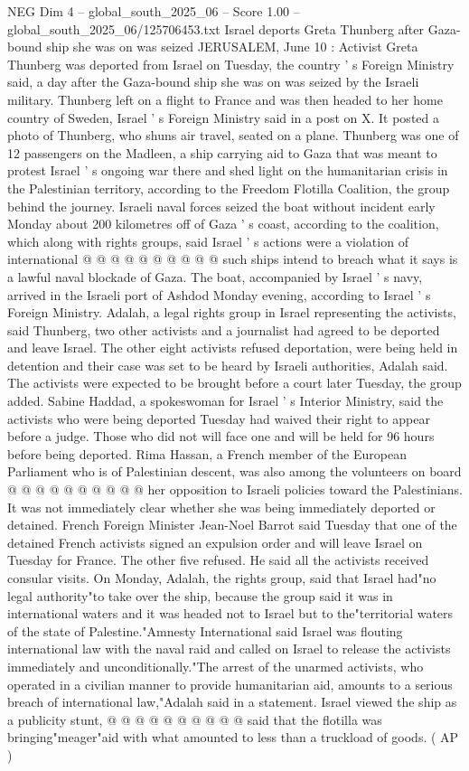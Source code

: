 \begin{textsample}{NEG Dim 4 – global\_south\_2025\_06 – Score 1.00 – global\_south\_2025\_06/125706453.txt}  \label{ex:f4_neg_106}
Israel deports Greta Thunberg after Gaza-bound ship she was on was seized JERUSALEM, June 10 : Activist Greta Thunberg was deported from Israel on Tuesday, the country ' s Foreign Ministry said, a day after the Gaza-bound ship she was on was seized by the Israeli military.
Thunberg left on a flight to France and was then headed to her home country of Sweden, Israel ' s Foreign Ministry said in a post on X.
It posted a photo of Thunberg, who shuns air travel, seated on a plane.
Thunberg was one of 12 passengers on the Madleen, a ship carrying aid to Gaza that was meant to protest Israel ' s ongoing war there and shed light on the humanitarian crisis in the Palestinian territory, according to the Freedom Flotilla Coalition, the group behind the journey.
Israeli naval forces seized the boat without incident early Monday about 200 kilometres off of Gaza ' s coast, according to the coalition, which along with rights groups, said Israel ' s actions were a violation of international @ @ @ @ @ @ @ @ @ @ such ships intend to breach what it says is a lawful naval blockade of Gaza.
The boat, accompanied by Israel ' s navy, arrived in the Israeli port of Ashdod Monday evening, according to Israel ' s Foreign Ministry.
Adalah, a legal rights group in Israel representing the activists, said Thunberg, two other activists and a journalist had agreed to be deported and leave Israel.
The other eight activists refused deportation, were being held in detention and their case was set to be heard by Israeli authorities, Adalah said.
The activists were expected to be brought before a court later Tuesday, the group added.
Sabine Haddad, a spokeswoman for Israel ' s Interior Ministry, said the activists who were being deported Tuesday had waived their right to appear before a judge.
Those who did not will face one and will be held for 96 hours before being deported.
Rima Hassan, a French member of the European Parliament who is of Palestinian descent, was also among the volunteers on board @ @ @ @ @ @ @ @ @ @ her opposition to Israeli policies toward the Palestinians.
It was not immediately clear whether she was being immediately deported or detained.
French Foreign Minister Jean-Noel Barrot said Tuesday that one of the detained French activists signed an expulsion order and will leave Israel on Tuesday for France.
The other five refused.
He said all the activists received consular visits.
On Monday, Adalah, the rights group, said that Israel had"no legal authority"to take over the ship, because the group said it was in international waters and it was headed not to Israel but to the"territorial waters of the state of Palestine."Amnesty International said Israel was flouting international law with the naval raid and called on Israel to release the activists immediately and unconditionally."The arrest of the unarmed activists, who operated in a civilian manner to provide humanitarian aid, amounts to a serious breach of international law,"Adalah said in a statement.
Israel viewed the ship as a publicity stunt, @ @ @ @ @ @ @ @ @ @ said that the flotilla was bringing"meager"aid with what amounted to less than a truckload of goods. ( AP )

\end{textsample}
